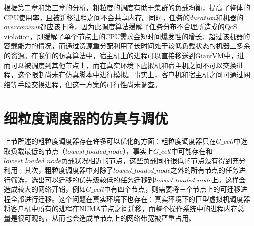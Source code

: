 根据第二章和第三章的分析，粗粒度的调度有助于集群的负载均衡，提高了整体的CPU使用率，且被迁移进程之间不会共享内存。同时，任务的$duration$和机器的$overcommit$都应该下降，因为此调度算法缓解了任务分布不合理所造成的QoS violation，即缓解了单个节点上的CPU需求会短时间爆发性的增长、超过该机器的容载能力的情况，而通过资源重分配利用了长时间处于较低负载状态的机器上多余的资源。在我们的仿真算法中，宿主机上的进程可以直接移送到GiantVM中，进而可以被调度到其他节点上，而在真实环境下虚拟机和宿主机之间不可以交换进程，这个限制尚未在仿真脚本中进行模拟。事实上，客户机和宿主机之间可通过网络等手段交换进程，但这一方案的可行性尚未调查。

\section{细粒度调度器的仿真与调优}
上节所述的粗粒度调度器存在许多可以优化的方面：粗粒度调度器只在$G\_cell$中选取负载最低的节点（$lowest\_loaded\_node$），事实上$G\_cell$中可能存在和$lowest\_loaded\_node$负载状况相近的节点，这些负载同样很低的节点没有得到充分利用；其次，粗粒度调度器中对除了$lowest\_loaded\_node$之外的所有节点的任务进行筛选，选出可以迁移的优先级较低的任务迁移到$lowest\_loaded\_node$上。这样会造成较大的网络开销，例如$G\_cell$中有四个节点，则需要将三个节点上的可迁移进程全部进行迁移。这个问题在真实环境下也存在：真实环境下的巨型虚拟机调度器将客户机中所有的进程在NUMA节点之间迁移，而整个操作系统中的进程内存总量是很可观的，从而也会造成单节点上的网络带宽被严重占用。

